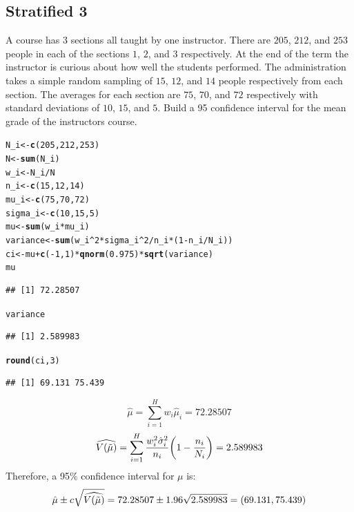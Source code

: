 \documentclass[oneside]{book}\usepackage[]{graphicx}\usepackage[dvipsnames,table,xcdraw]{xcolor}
\makeatletter
\newcommand{\hlnum}[1]{\textcolor[rgb]{0.686,0.059,0.569}{#1}}%
\newcommand{\hlopt}[1]{\textcolor[rgb]{0,0,0}{#1}}%
\newcommand{\hlstd}[1]{\textcolor[rgb]{0.345,0.345,0.345}{#1}}%
\newcommand{\hlkwb}[1]{\textcolor[rgb]{0.69,0.353,0.396}{#1}}%
\newcommand{\hlkwd}[1]{\textcolor[rgb]{0.737,0.353,0.396}{\textbf{#1}}}%
\newenvironment{kframe}{%
 \def\at@end@of@kframe{}%
 \ifinner\ifhmode%
  \def\at@end@of@kframe{\end{minipage}}%
  \begin{minipage}{\columnwidth}%
 \fi\fi%
 \def\FrameCommand##1{\hskip\@totalleftmargin \hskip-\fboxsep
 \colorbox{shadecolor}{##1}\hskip-\fboxsep
     \hskip-\linewidth \hskip-\@totalleftmargin \hskip\columnwidth}%
 \MakeFramed {\advance\hsize-\width
   \@totalleftmargin\z@ \linewidth\hsize
   \@setminipage}}%
 {\par\unskip\endMakeFramed%
 \at@end@of@kframe}
\newenvironment{knitrout}{}{} %
\let\mathbb\relax
\makeatother
\begin{document}
\subsection{Stratified 3}
A course has 3 sections all taught by one instructor. There
are $205$, $212$, and $253$ people in each of the sections
$1$, $2$, and $3$ respectively. At the end of the term the instructor
is curious about how well the students performed. The administration
takes a simple random sampling of $15$, $12$, and $14$ people respectively from each section.
The averages for each section are $75$, $70$, and $72$ respectively
with standard deviations of $10$, $15$, and $5$. Build a 95%
confidence interval for the mean grade of the instructors course.

\begin{knitrout}
\color{fgcolor}\begin{kframe}
\begin{alltt}
\hlstd{N_i} \hlkwb{<-} \hlkwd{c}\hlstd{(}\hlnum{205}\hlstd{,} \hlnum{212}\hlstd{,} \hlnum{253}\hlstd{)}
\hlstd{N} \hlkwb{<-} \hlkwd{sum}\hlstd{(N_i)}
\hlstd{w_i} \hlkwb{<-} \hlstd{N_i}\hlopt{/}\hlstd{N}
\hlstd{n_i} \hlkwb{<-} \hlkwd{c}\hlstd{(}\hlnum{15}\hlstd{,} \hlnum{12}\hlstd{,} \hlnum{14}\hlstd{)}
\hlstd{mu_i} \hlkwb{<-} \hlkwd{c}\hlstd{(}\hlnum{75}\hlstd{,} \hlnum{70}\hlstd{,} \hlnum{72}\hlstd{)}
\hlstd{sigma_i} \hlkwb{<-} \hlkwd{c}\hlstd{(}\hlnum{10}\hlstd{,} \hlnum{15}\hlstd{,} \hlnum{5}\hlstd{)}
\hlstd{mu} \hlkwb{<-} \hlkwd{sum}\hlstd{(w_i} \hlopt{*} \hlstd{mu_i)}
\hlstd{variance} \hlkwb{<-} \hlkwd{sum}\hlstd{(w_i}\hlopt{^}\hlnum{2} \hlopt{*} \hlstd{sigma_i}\hlopt{^}\hlnum{2}\hlopt{/}\hlstd{n_i} \hlopt{*} \hlstd{(}\hlnum{1} \hlopt{-} \hlstd{n_i}\hlopt{/}\hlstd{N_i))}
\hlstd{ci} \hlkwb{<-} \hlstd{mu} \hlopt{+} \hlkwd{c}\hlstd{(}\hlopt{-}\hlnum{1}\hlstd{,} \hlnum{1}\hlstd{)} \hlopt{*} \hlkwd{qnorm}\hlstd{(}\hlnum{0.975}\hlstd{)} \hlopt{*} \hlkwd{sqrt}\hlstd{(variance)}
\hlstd{mu}
\end{alltt}
\begin{verbatim}
## [1] 72.28507
\end{verbatim}
\begin{alltt}
\hlstd{variance}
\end{alltt}
\begin{verbatim}
## [1] 2.589983
\end{verbatim}
\begin{alltt}
\hlkwd{round}\hlstd{(ci,} \hlnum{3}\hlstd{)}
\end{alltt}
\begin{verbatim}
## [1] 69.131 75.439
\end{verbatim}
\end{kframe}
\end{knitrout}

\[ \hat{\mu}=\sum_{i=1}^H w_i \hat{\mu}_i=72.28507 \]
\[\widehat{\mathbb{V}(\tilde{\mu})}=\sum_{i=1}^{H} \frac{w_i^2\hat{\sigma}_i^2}{n_i}\biggl(1-\frac{n_i}{N_i} \biggr)=2.589983 \]
Therefore, a 95\% confidence interval for $\mu$ is:
\[\hat{\mu}\pm c\sqrt{\widehat{\mathbb{V}(\tilde{\mu})}}=72.28507\pm 1.96\sqrt{2.589983}=(69.131,75.439) \]




\end{document}
